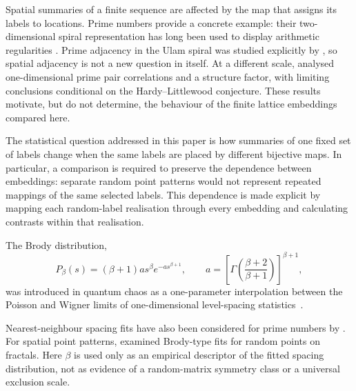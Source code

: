 \documentclass[final,1p,times,authoryear]{elsarticle}
\theoremstyle{definition}
\begin{document}
Spatial summaries of a finite sequence are affected by the map that assigns
its labels to locations. Prime numbers provide a concrete example: their
two-dimensional spiral representation has long been used to display
arithmetic regularities \citep{ULAM-SPIRAL-1963}. Prime adjacency in the
Ulam spiral was studied explicitly by \citet{JARA-VERA-SANCHEZ-AVILA-2021},
so spatial adjacency is not a new question in itself. At a different scale,
\citet{TORQUATO-ZHANG-DECOURCY-2019} analysed one-dimensional prime pair
correlations and a structure factor, with limiting conclusions conditional on
the Hardy--Littlewood conjecture. These results motivate, but do not determine,
the behaviour of the finite lattice embeddings compared here.

The statistical question addressed in this paper is how summaries of one
fixed set of labels change when the same labels are placed by different
bijective maps. In particular, a comparison is required to preserve the
dependence between embeddings: separate random point patterns would not
represent repeated mappings of the same selected labels. This dependence is
made explicit by mapping each random-label realisation through every embedding
and calculating contrasts within that realisation.

The Brody distribution,
\begin{equation}
P_\beta(s)=(\beta+1)as^\beta e^{-as^{\beta+1}},
\qquad
a=\left[\Gamma\!\left(\frac{\beta+2}{\beta+1}\right)\right]^{\beta+1},
\label{eq:brody}
\end{equation}
was introduced in quantum chaos as a one-parameter interpolation between the
Poisson and Wigner limits of one-dimensional level-spacing
statistics~\citep{BRODY-1981}.

Nearest-neighbour spacing fits have also been considered for prime numbers by
\citet{WOLF-2014}. For spatial point patterns, \citet{SAKHR-NIEMINEN-2005}
examined Brody-type fits for random points on fractals. Here $\beta$ is used
only as an empirical descriptor of the fitted spacing distribution, not as
evidence of a random-matrix symmetry class or a universal exclusion scale.
\end{document}
